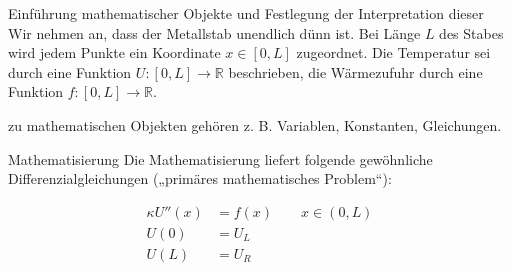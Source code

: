 \documentclass[a4paper]{scrartcl}
\numberwithin{equation}{section}
\begin{document}
\begin{seg}{Einführung mathematischer Objekte und Festlegung der Interpretation dieser}
Wir nehmen an, dass der Metallstab unendlich dünn ist.
Bei Länge $L$ des Stabes wird jedem Punkte ein Koordinate $x \in [0,L]$ zugeordnet.
Die Temperatur sei durch eine Funktion $U:[0,L]\rightarrow \mathbb R$ beschrieben, die 
Wärmezufuhr durch eine Funktion $f : [0,L] \rightarrow \mathbb R$.
\end{seg}
\begin{note}
zu mathematischen Objekten gehören z. B. Variablen, Konstanten, Gleichungen.
\end{note}

\begin{seg}{Mathematisierung}
	Die Mathematisierung liefert folgende gewöhnliche Differenzialgleichungen („primäres mathematisches Problem“):

\begin{align*}
	\label{eq:1.1}
\kappa U''(x) &= f(x) \qquad	x \in (0,L)  \tag{1.1}\\ 
U(0) &= U_L \\	
U(L) &= U_R \\
\end{align*}
\end{seg}
\end{document}
